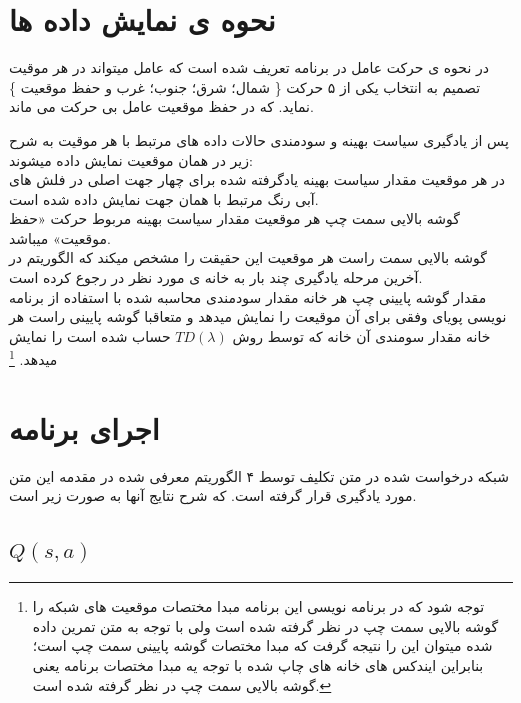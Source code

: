 \documentclass[10pt,a4paper]{article}
\begin{document}
\begin{Arabic}
\section{\textarabic{نحوه ی نمایش داده ها}}
در نحوه ی حرکت عامل در برنامه تعریف شده است که عامل میتواند در هر موقیت تصمیم به انتخاب یکی از ۵ حرکت
\{
 شمال؛ شرق؛ جنوب؛ غرب و حفظ موقعیت
\}
نماید. که در حفظ موقعیت عامل بی حرکت می ماند.
\par
پس از یادگیری سیاست بهینه و سودمندی حالات داده های مرتبط با هر موقیت به شرح زیر در همان موقعیت نمایش داده میشوند:\\
در هر موقعیت مقدار سیاست بهینه یادگرفته شده برای چهار جهت اصلی در فلش های آبی رنگ مرتبط با همان جهت نمایش داده شده است.\\
گوشه بالایی سمت چپ هر موقعیت مقدار سیاست بهینه مربوط حرکت «حفظ موقعیت» میباشد.\\
گوشه بالایی سمت راست هر موقعیت این حقیقت را مشخص میکند که الگوریتم در آخرین مرحله یادگیری چند بار به خانه ی مورد نظر در رجوع کرده است.\\
مقدار گوشه پایینی چپ هر خانه مقدار سودمندی محاسبه شده با استفاده از برنامه نویسی پویای وفقی برای آن موقیعت را نمایش میدهد و متعاقبا گوشه پایینی راست هر خانه مقدار سومندی آن خانه که توسط روش
\textenglish{$TD(\lambda)$}
حساب شده است را نمایش میدهد.
\footnote{\textarabic{توجه شود که در برنامه نویسی این برنامه مبدا مختصات موقعیت های شبکه را گوشه بالایی سمت چپ در نظر گرفته شده است ولی با توجه به متن تمرین داده شده میتوان این را نتیجه گرفت که مبدا مختصات گوشه پایینی سمت چپ است؛ بنابراین ایندکس های خانه های چاپ شده با توجه یه مبدا مختصات برنامه یعنی گوشه بالایی سمت چپ در نظر گرفته شده است.}}



\section{\textarabic{اجرای برنامه}}
شبکه درخواست شده در متن تکلیف توسط ۴ الگوریتم معرفی شده در مقدمه این متن مورد یادگیری قرار گرفته است. که شرح نتایج آنها به صورت زیر است.

\subsection{$Q(s, a)$}

\end{Arabic}
\end{document}
